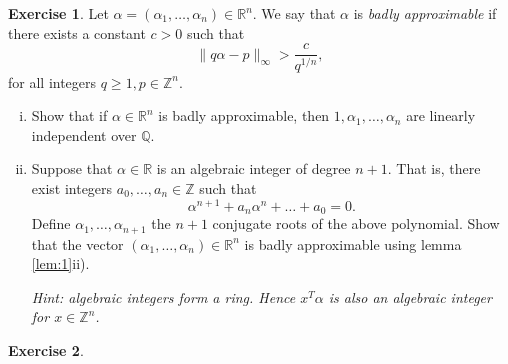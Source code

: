 \documentclass[12pt,a4paper]{article}
\theoremstyle{plain}
\newtheorem*{Sol*}{Solution}
\theoremstyle{definition}
\newtheorem{Ex}{Exercise}
\def \Q {\mathbb Q}
\def \R {\mathbb R}
\def \Z {\mathbb Z}
\newif\ifsolutions
\newcommand{\exercise}[2]{
			\begin{Ex} #1 \end{Ex}
			\ifsolutions  \begin{Sol*} #2 \end{Sol*} \bigskip \else \bigskip  \fi
		}
\begin{document}
\exercise{
	Let $\alpha = (\alpha_1, \dots, \alpha_n) \in \R^n$. We say that $\alpha$ is \emph{badly approximable} if there exists a constant $c > 0$ such that
		\[ \| q \alpha - p \|_\infty > \frac{c}{q^{1/n}}, \]
	for all integers $q \geq 1, p \in \Z^n$.

	\begin{enumerate}[i)]
		\item Show that if $\alpha \in \R^n$ is badly approximable, then $1, \alpha_1, \dots, \alpha_n$ are linearly independent over $\Q$.
		\item Suppose that $\alpha \in \R$ is an algebraic integer of degree $n+1$. That is, there exist integers $a_0, \dots, a_{n} \in \Z$ such that
			\[ \alpha^{n+1} + a_{n} \alpha^{n} + \dots +  a_{0} = 0. \]
		Define $\alpha_1, \dots, \alpha_{n+1}$ the $n+1$ conjugate roots of the above polynomial.
		Show that the vector $(\alpha_1, \dots, \alpha_n) \in \R^n$ is badly approximable using lemma \ref{lem:1}ii).

		\emph{Hint: algebraic integers form a ring. Hence $x^T \alpha$ is also an algebraic integer for $x \in \Z^n$.}
	\end{enumerate}
}
{
	\begin{enumerate}[i)]
		\item Notice that the direction ii) $\implies$ i) of exercise 4 does not use the linear independence of $1, \alpha_1, \dots, \alpha_n$ over $\Q$.
			In fact, given $x \in \Z^n \setminus \{0\}$, $y\in\Z$ such that $x^T \alpha -y = 0$, one may find integers $q \geq 1, p\in\Z^n$ such that
				\[ \| q \alpha - p \|_\infty \leq \frac{c_1}{q^{1/n}}, \]
			where $c_1$ is as small as required. 
			This contradicts the assumption that $\alpha$ is badly approximable.

		\item By the hint, $x^T\alpha - y$ is an algebraic integer of degree $n+1$ for each $x \in \Z^n \setminus \{0\}, y\in\Z$.
			Fix $M = \max\{ | \alpha_1|, \dots, | \alpha_{n+1} |\}$, and consider the norm of $x^T\alpha - y$.

			By Galois theory, the norm is integer, and given by the product over all images by the Galois group automorphisms of the field extension.
			Since the automorphism only permute the roots, sending one conjugate of $\alpha$ to another, we get
				\[ | \sigma(x^T\alpha - y) | = | \sum_{i=1}^n x_i \sigma(\alpha_i) - y | \leq n \| x \|_\infty M + |y| \leq \| x \|_\infty \left( 1 + 2 n M \right), \]
			where we've used that $|y| \leq (1 + nM)\|x \|_\infty$ whenever $| x^T\alpha - y| \leq 1$. 
		
				\[ | N(x^T \alpha - y) | = | x^T \alpha - y | \cdot \prod_{\sigma \neq id} | \sigma(x^T\alpha - y) | \leq | x^T \alpha - y |  \cdot \| x \|_\infty^n ( 1 + 2 n M)^n. \]
			To conclude, we use that the norm is a non-zero integer, by linear independence and the fact that it is an algebraic integer.
			This implies $| N(x^T \alpha - y) | \geq 1$, and shows that Lemma~\ref{lem:1}ii) cannot hold for $c$ small enough.

	\end{enumerate}
}




\exercise{
}{}
\end{document}
